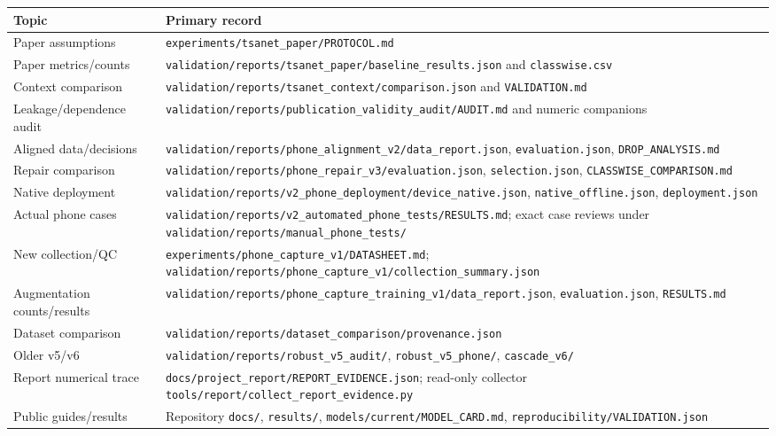 \documentclass[11pt,a4paper,oneside]{report}
\newcommand{\code}[1]{\nolinkurl{#1}}
\begin{document}
\begin{longtable}{p{}p{}}
\toprule Topic & Primary record\\\midrule\endhead
Paper assumptions & \code{experiments/tsanet_paper/PROTOCOL.md}\\
Paper metrics/counts & \code{validation/reports/tsanet_paper/baseline_results.json} and \code{classwise.csv}\\
Context comparison & \code{validation/reports/tsanet_context/comparison.json} and \code{VALIDATION.md}\\
Leakage/dependence audit & \code{validation/reports/publication_validity_audit/AUDIT.md} and numeric companions\\
Aligned data/decisions & \code{validation/reports/phone_alignment_v2/data_report.json}, \code{evaluation.json}, \code{DROP_ANALYSIS.md}\\
Repair comparison & \code{validation/reports/phone_repair_v3/evaluation.json}, \code{selection.json}, \code{CLASSWISE_COMPARISON.md}\\
Native deployment & \code{validation/reports/v2_phone_deployment/device_native.json}, \code{native_offline.json}, \code{deployment.json}\\
Actual phone cases & \code{validation/reports/v2_automated_phone_tests/RESULTS.md}; exact case reviews under \code{validation/reports/manual_phone_tests/}\\
New collection/QC & \code{experiments/phone_capture_v1/DATASHEET.md}; \code{validation/reports/phone_capture_v1/collection_summary.json}\\
Augmentation counts/results & \code{validation/reports/phone_capture_training_v1/data_report.json}, \code{evaluation.json}, \code{RESULTS.md}\\
Dataset comparison & \code{validation/reports/dataset_comparison/provenance.json}\\
Older v5/v6 & \code{validation/reports/robust_v5_audit/}, \code{robust_v5_phone/}, \code{cascade_v6/}\\
Report numerical trace & \code{docs/project_report/REPORT_EVIDENCE.json}; read-only collector \code{tools/report/collect_report_evidence.py}\\
Public guides/results & Repository \code{docs/}, \code{results/}, \code{models/current/MODEL_CARD.md}, \code{reproducibility/VALIDATION.json}\\
\bottomrule
\end{longtable}
\end{document}
